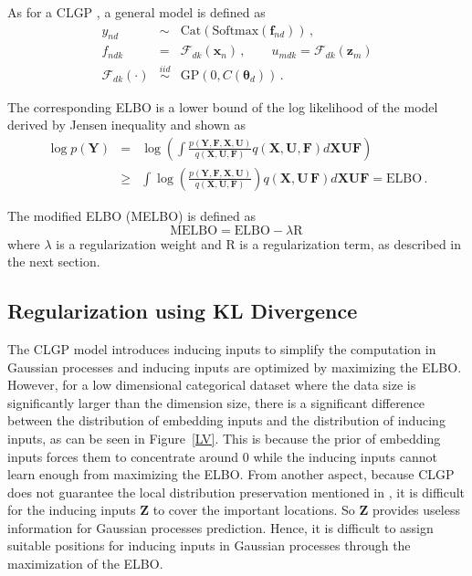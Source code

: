 \documentclass{article}
\begin{document}
As for a CLGP \citep{Gal_2015}, a general model is defined as
\begin{eqnarray}
y_{nd} & \sim & \mathrm{Cat}(\mathrm{Softmax}(\bm f_{nd}))\,, \nonumber \\
f_{ndk} & = & \mathcal{F}_{dk}(\bm x_n) \,, \qquad u_{mdk} = \mathcal{F}_{dk}(\bm z_m) \nonumber \\
\mathcal{F}_{dk}(\cdot) & \stackrel{iid}{\sim} & \mathrm{GP}(0, C(\bm{\theta}_d))\,.
\label{CLGP}
\end{eqnarray}

The corresponding ELBO is a lower bound of the log likelihood of the model derived by Jensen inequality and shown as
\begin{eqnarray}
\log p(\bm Y) & = & \log\left(\int \frac{p(\bm Y, \bm F, \bm X, \bm U) }{q(\bm X, \bm U, \bm F)} q(\bm X, \bm U, \bm F) d \bm X\bm U\bm F\right) \nonumber \\
& \geq & \int \log\left(\frac{p(\bm Y, \bm F, \bm X, \bm U) }{q(\bm X, \bm U, \bm F)}\right) q(\bm X, \bm U\, \bm F) d\bm X \bm U \bm F = \mathrm{ELBO}\,.
\end{eqnarray}

The modified ELBO (MELBO) is defined as 
\begin{equation}
\mathrm{MELBO} = \mathrm{ELBO} - \lambda \mathrm{R}\,
\end{equation}
where $\lambda$ is a regularization weight and $\mathrm{R}$ is a regularization term, as described in the next section.

\subsection{Regularization using KL Divergence}
The CLGP model introduces inducing inputs to simplify the computation in Gaussian processes and inducing inputs are optimized by maximizing the ELBO. However, for a low dimensional categorical dataset where the data size is significantly larger than the dimension size, there is a significant difference between the distribution of embedding inputs and the distribution of inducing inputs, as can be seen in Figure~\ref{LV}. This is because the prior of embedding inputs forces them to concentrate around $0$ while the inducing inputs cannot learn enough from maximizing the ELBO. From another aspect, because CLGP does not guarantee the local distribution preservation mentioned in \cite{Lawrence_2007_HGP}, it is difficult for the inducing inputs $\bm Z$ to cover the important locations. So $\bm Z$ provides useless information for Gaussian processes prediction. Hence, it is difficult to assign suitable positions for inducing inputs in Gaussian processes through the maximization of the ELBO. 
\end{document}
